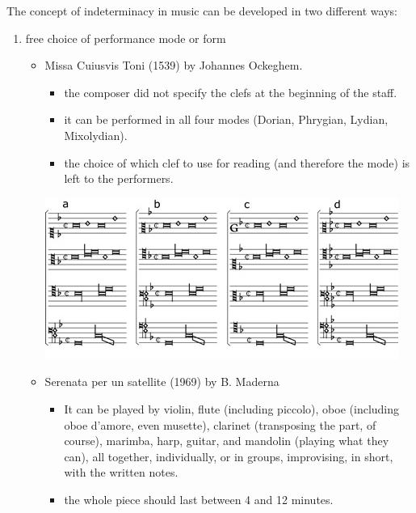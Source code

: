 The concept of indeterminacy in music can be developed in two different ways:

\begin{enumerate}
\def\labelenumi{\arabic{enumi}.}
\tightlist
\item free choice of performance mode or form

  \begin{itemize}
  \tightlist
  \item Missa Cuiusvis Toni (1539) by Johannes Ockeghem.

    \begin{itemize}
    \tightlist
    \item the composer did not specify the clefs at the beginning of the staff.
    \item it can be performed in all four modes (Dorian, Phrygian, Lydian,  Mixolydian).
    \item the choice of which clef to use for reading (and therefore the mode) is left to the performers.
    \end{itemize}
    
    \begin{center}
    \includegraphics[scale=0.7]{../img/Cuiusvis_toni.png}
    \end{center}
  \item Serenata per un satellite (1969) by B. Maderna

    \begin{itemize}
    \tightlist
    \item It can be played by violin, flute (including piccolo), oboe (including oboe d'amore, even musette), clarinet (transposing the part, of course), marimba, harp, guitar, and mandolin (playing what they can), all together, individually, or in groups, improvising, in short, with the written notes.
    \item the whole piece should last between 4 and 12 minutes.
    \end{itemize}


\end{itemize}
\end{enumerate}
